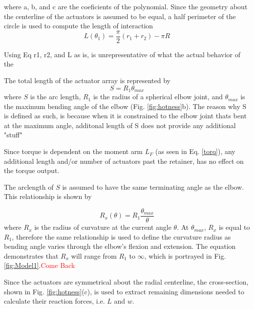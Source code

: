 where a, b, and c are the coeficients of the polynomial. Since the geometry about the centerline of the actuators is assumed to be equal, a half  perimeter of the circle is used to compute the length of interaction
 \begin{equation}\label{L}
	L(\theta_1)  = \frac{\pi}{2}(r_1+r_2) -\pi R
\end{equation}

Using Eq r1, r2, and L as is, is unrepresentative of what the actual behavior of the 


The total length of the actuator array is represented by
\begin{equation}\label{S}
	S = R_1\theta_{max}
\end{equation} 
where  $S$ is the arc length, $R_1$ is the radius of a spherical elbow joint, and  $\theta_{max}$ is the maximum bending angle of the elbow (Fig. \ref{fig:hotness}b). The reason why S is defined as such, is because when it is constrained to the elbow joint thats bent at the maximum angle, additonal length of S does not provide any additional "stuff"

Since torque is dependent on the moment arm $L_F$ (as seen in Eq. \ref{torq}), any additional length and/or number of actuators past the retainer, has no effect on the torque output.

The arclength of $S$ is assumed to have the same terminating angle as the elbow.  This relationship is shown by

\begin{equation}\label{Rx2}
	R_x(\theta) = R_1\frac{\theta_{max}}{\theta}
\end{equation}
where $R_x$  is  the radius of curvature at the current angle $\theta$.  At $\theta_{max}$, $R_x$ is equal to $R_1$, therefore the same relationship is used to define the curvature radius  as bending angle varies through the elbow's flexion and extension. The equation demonstrates that $R_x$ will range from $R_1$ to ${\infty}$, which is portrayed in Fig. \ref{fig:Model1}.\textcolor{red}{Come Back}

Since the actuators are symmetrical about the radial centerline, the cross-section, shown in Fig. \ref{fig:hotness}(c), is used to extract remaining dimensions needed to calculate their reaction forces, i.e. $L$ and $w$.

